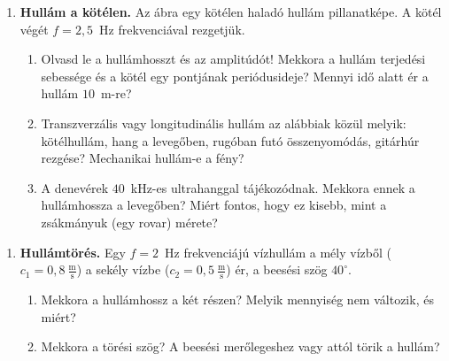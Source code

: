 \documentclass[12pt]{article}
\begin{document}
\begin{minipage}[t]{0.58\linewidth}\vspace{0pt}
\begin{enumerate}[start=4]
\item \textbf{Hullám a kötélen.} Az ábra egy kötélen haladó hullám pillanatképe. A kötél
  végét $f = 2{,}5$~Hz frekvenciával rezgetjük.
  \begin{enumerate}
    \item Olvasd le a hullámhosszt és az amplitúdót! Mekkora a hullám terjedési sebessége és
      a kötél egy pontjának periódusideje? Mennyi idő alatt ér a hullám $10$~m-re?
    \item Transzverzális vagy longitudinális hullám az alábbiak közül melyik: kötélhullám,
      hang a levegőben, rugóban futó összenyomódás, gitárhúr rezgése? Mechanikai hullám-e a
      fény?
    \item A denevérek $40$~kHz-es ultrahanggal tájékozódnak. Mekkora ennek a hullámhossza a
      levegőben? Miért fontos, hogy ez kisebb, mint a zsákmányuk (egy rovar) mérete?
  \end{enumerate}
\end{enumerate}
\end{minipage}\hfill
\begin{minipage}[t]{0.39\linewidth}\vspace{0pt}\centering
{}
\end{minipage}

\newpage
\begin{enumerate}[start=5]
\item \textbf{Hullámtörés.} Egy $f = 2$~Hz frekvenciájú vízhullám a mély vízből
  ($c_1 = 0{,}8~\tfrac{\text{m}}{\text{s}}$) a sekély vízbe ($c_2 = 0{,}5~\tfrac{\text{m}}{\text{s}}$)
  ér, a beesési szög $40^\circ$.
  \begin{enumerate}
    \item Mekkora a hullámhossz a két részen? Melyik mennyiség nem változik, és miért?
    \item Mekkora a törési szög? A beesési merőlegeshez vagy attól törik a hullám?
  \end{enumerate}
\end{enumerate}
\end{document}
